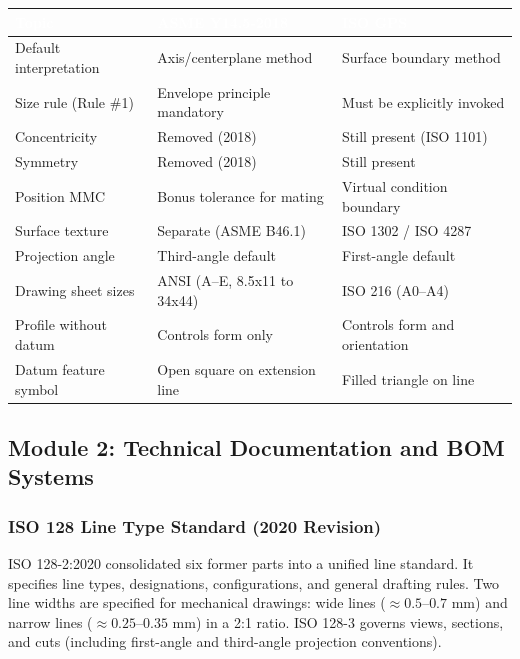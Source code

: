 \documentclass[11pt,letterpaper]{article}
\newcommand{\tableheader}[1]{\textbf{\sffamily\textcolor{white}{#1}}}
\begin{document}
\begin{center}
\begin{tabularx}{\textwidth}{L{4cm}L{4.5cm}X}
\toprule
{}
\tableheader{Topic} & \tableheader{ASME Y14.5-2018} & \tableheader{ISO GPS} \\
\midrule
Default interpretation & Axis/centerplane method & Surface boundary method \\
Size rule (Rule \#1) & Envelope principle mandatory & Must be explicitly invoked \\
Concentricity & Removed (2018) & Still present (ISO 1101) \\
Symmetry & Removed (2018) & Still present \\
Position MMC & Bonus tolerance for mating & Virtual condition boundary \\
Surface texture & Separate (ASME B46.1) & ISO 1302 / ISO 4287 \\
Projection angle & Third-angle default & First-angle default \\
Drawing sheet sizes & ANSI (A--E, 8.5x11 to 34x44) & ISO 216 (A0--A4) \\
Profile without datum & Controls form only & Controls form and orientation \\
Datum feature symbol & Open square on extension line & Filled triangle on line \\
\bottomrule
\end{tabularx}
\end{center}

\subsection{Module 2: Technical Documentation and BOM Systems}

\subsubsection{ISO 128 Line Type Standard (2020 Revision)}

ISO 128-2:2020 consolidated six former parts into a unified line standard. It specifies line types, designations, configurations, and general drafting rules. Two line widths are specified for mechanical drawings: wide lines ($\approx 0.5$--$0.7$ mm) and narrow lines ($\approx 0.25$--$0.35$ mm) in a 2:1 ratio. ISO 128-3 governs views, sections, and cuts (including first-angle and third-angle projection conventions).
\end{document}
